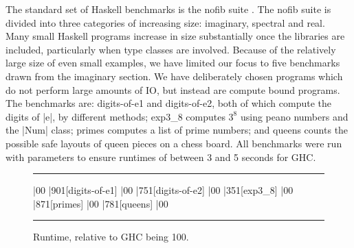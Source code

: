 \documentclass{llncs}
\newenvironment{fig}
    {\begin{figure}[tbp]\hrule}
    {\end{figure}}
\newcommand{\figend}{\hrule}
\begin{document}
The standard set of Haskell benchmarks is the nofib suite \cite{nofib}. The nofib suite is divided into three categories of increasing size: imaginary, spectral and real. Many small Haskell programs increase in size substantially once the libraries are included, particularly when type classes are involved. Because of the relatively large size of even small examples, we have limited our focus to five benchmarks drawn from the imaginary section. We have deliberately chosen programs which do not perform large amounts of IO, but instead are compute bound programs.
The benchmarks are: digits-of-e1 and digits-of-e2, both of which compute the digits of |e|, by different methods; exp3\_8 computes $3^8$ using peano numbers and the |Num| class; primes computes a list of prime numbers; and queens counts the possible safe layouts of queen pieces on a chess board. All benchmarks were run with parameters to ensure runtimes of between 3 and 5 seconds for GHC.

\begin{fig}
\vspace{7mm}
\begin{barenv}
 
\bar{0}{0}
\bar{90}{1}[digits-of-e1]
\bar{0}{0}
\bar{75}{1}[digits-of-e2]
\bar{0}{0}
\bar{35}{1}[exp3\_8]
\bar{0}{0}
\bar{87}{1}[primes]
\bar{0}{0}
\bar{78}{1}[queens]
\bar{0}{0}
\end{barenv}
\vspace{3mm}
\figend
\caption{Runtime, relative to GHC being 100.}
\label{fig:haskell_results}
\end{fig}
\end{document}
